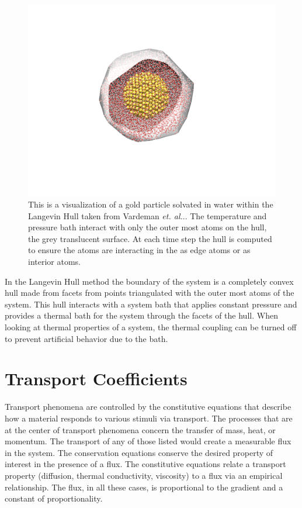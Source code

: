 \begin{figure}
    \centering
    \includegraphics[scale=1]{figures/hull.pdf}
    \caption{This is a visualization of a gold particle solvated in water within the Langevin Hull taken from Vardeman \textit{et. al.}.\cite{Vardeman2011}. The temperature and pressure bath interact with only the outer most atoms on the hull, the grey translucent surface. At each time step the hull is computed to ensure the atoms are interacting in the as edge atoms or as interior atoms.}
    \label{fig:hull}
\end{figure}

In the Langevin Hull method the boundary of the system is a completely convex hull made from facets from points triangulated with the outer most atoms of the system. This hull interacts with a system bath that applies constant pressure and provides a thermal bath for the system through the facets of the hull. When looking at thermal properties of a system, the thermal coupling can be turned off to prevent artificial behavior due to the bath.

\section{Transport Coefficients}
Transport phenomena are controlled by the constitutive equations that describe how a material responds to various stimuli via transport.
The processes that are at the center of transport phenomena concern the transfer of mass, heat, or momentum. The transport of any of those listed would create a measurable flux in the system. The conservation equations conserve the desired property of interest in the presence of a flux.
The constitutive equations relate a transport property (diffusion, thermal conductivity, viscosity) to a flux via an empirical relationship. The flux, in all these cases, is proportional to the gradient and a constant of proportionality.

